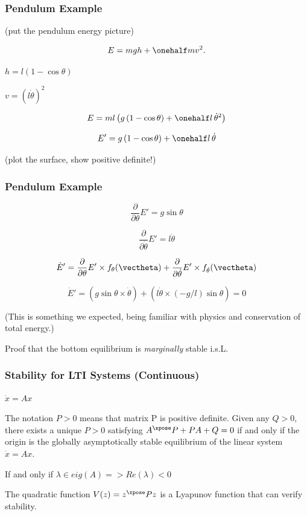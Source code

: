 \documentclass[12pt]{beamer}
\begin{document}
\begin{frame}
\frametitle{Pendulum Example}

(put the pendulum energy picture)

\[
E = mgh + \onehalf m v^2.
\]

$h = l(1-\cos\theta)$

$v = (l\dot\theta)^2$

\[
E
	= ml \left( g \, (1-\cos\theta) + \onehalf l \, \dot\theta^2 \right)
\]

\[
E' = g \, (1-\cos\theta) + \onehalf l \, \dot\theta
\]

(plot the surface, show positive definite!)

\end{frame}



\begin{frame}
\frametitle{Pendulum Example}
\[
\frac{\partial}{\partial\theta} E' = g \sin \theta
\]

\[
\frac{\partial}{\partial\dot\theta} E' = l \dot\theta
\]

\[
\dot E' =
	\frac{\partial}{\partial\theta} E' 
		\times f_{\theta}(\vectheta)
	+ \frac{\partial}{\partial\dot\theta} E'
		\times f_{\dot\theta}(\vectheta)
\]


\[
\dot E' =
	\left( g \sin\theta \times \dot\theta \right)
	+ \left( l \dot\theta \times (-g/l) \sin \theta \right) = 0
\]

(This is something we expected, being familiar with physics and conservation of total energy.)

Proof that the bottom equilibrium is \emph{marginally} stable i.s.L.

\end{frame}





\begin{frame}
\frametitle{Stability for LTI Systems (Continuous)}
$\dot x = Ax$

The notation $P > 0$ means that matrix P is positive definite.
Given any $Q > 0$, there exists a unique $P > 0$ satisfying 
$A^\xpose P + P A + Q = 0$ if and only if the origin is the globally asymptotically stable equilibrium of the linear system $\dot x = A x$.

If and only if $\lambda \in eig(A) => Re(\lambda) < 0$

The quadratic function $V(z) = z^\xpose P z$ is a Lyapunov function that can verify stability.

\end{frame}
\end{document}
